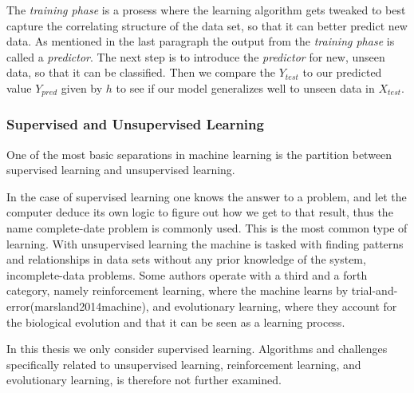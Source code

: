 	The \textit{training phase} is a prosess where the learning algorithm gets tweaked to best capture the correlating structure of the data set, so that it can better predict new data. As mentioned in the last paragraph the output from the \textit{training phase} is called a \textit{predictor}. The next step is to introduce the \textit{predictor} for new, unseen data, so that it can be classified. Then we compare the $Y_{test}$ to our predicted value $Y_{pred}$ given by $h$ to see if our model generalizes well to unseen data in $X_{test}$. 
	
	\subsubsection{Supervised and Unsupervised Learning }
	One of the most basic separations in machine learning is the partition between supervised learning and unsupervised learning. \cite{gentle2012handbook}
	
	In the case of supervised learning one knows the answer to a problem, and let the computer deduce its own logic to figure out how we get to that result, thus the name complete-date problem is commonly used. This is the most common type of learning. With unsupervised learning the machine is tasked with finding patterns and relationships in data sets without any prior knowledge of the system, incomplete-data problems. Some authors operate with a third and a forth category, namely reinforcement learning, where the machine learns by trial-and-error(marsland2014machine), and evolutionary learning, where they account for the biological evolution and that it can be seen as a learning process.
		
	In this thesis we only consider supervised learning. Algorithms and challenges specifically related to unsupervised learning, reinforcement learning, and evolutionary learning, is therefore not further examined. 

